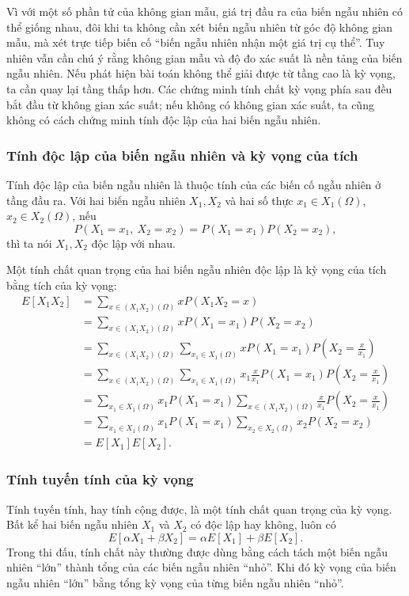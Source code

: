 \documentclass[11pt]{article}
\begin{document}
Vì với một số phần tử của không gian mẫu, giá trị đầu ra của biến ngẫu nhiên
có thể giống nhau, đôi khi ta không cần xét biến ngẫu nhiên từ góc độ không
gian mẫu, mà xét trực tiếp biến cố ``biến ngẫu nhiên nhận một giá trị cụ
thể''. Tuy nhiên vẫn cần chú ý rằng không gian mẫu và độ đo xác suất là nền
tảng của biến ngẫu nhiên. Nếu phát hiện bài toán không thể giải được từ tầng
cao là kỳ vọng, ta cần quay lại tầng thấp hơn. Các chứng minh tính chất kỳ
vọng phía sau đều bắt đầu từ không gian xác suất; nếu không có không gian xác
suất, ta cũng không có cách chứng minh tính độc lập của hai biến ngẫu nhiên.

\subsubsection{Tính độc lập của biến ngẫu nhiên và kỳ vọng của tích}

Tính độc lập của biến ngẫu nhiên là thuộc tính của các biến cố ngẫu nhiên ở
tầng đầu ra. Với hai biến ngẫu nhiên \(X_1,X_2\) và hai số thực
\(x_1\in X_1(\Omega)\), \(x_2\in X_2(\Omega)\), nếu
\[
  P(X_1=x_1,\ X_2=x_2)=P(X_1=x_1)P(X_2=x_2),
\]
thì ta nói \(X_1,X_2\) độc lập với nhau.

Một tính chất quan trọng của hai biến ngẫu nhiên độc lập là kỳ vọng của tích
bằng tích của kỳ vọng:
\[
\begin{aligned}
E[X_1X_2]
  &= \sum_{x\in (X_1X_2)(\Omega)} xP(X_1X_2=x)\\
  &= \sum_{x\in (X_1X_2)(\Omega)}
     xP(X_1=x_1)P(X_2=x_2)\\
  &= \sum_{x\in (X_1X_2)(\Omega)}
     \sum_{x_1\in X_1(\Omega)}
     xP(X_1=x_1)P\left(X_2=\frac{x}{x_1}\right)\\
  &= \sum_{x\in (X_1X_2)(\Omega)}
     \sum_{x_1\in X_1(\Omega)}
     x_1\frac{x}{x_1}P(X_1=x_1)P\left(X_2=\frac{x}{x_1}\right)\\
  &= \sum_{x_1\in X_1(\Omega)} x_1P(X_1=x_1)
     \sum_{x\in (X_1X_2)(\Omega)}
     \frac{x}{x_1}P\left(X_2=\frac{x}{x_1}\right)\\
  &= \sum_{x_1\in X_1(\Omega)} x_1P(X_1=x_1)
     \sum_{x_2\in X_2(\Omega)} x_2P(X_2=x_2)\\
  &= E[X_1]E[X_2].
\end{aligned}
\]

\subsubsection{Tính tuyến tính của kỳ vọng}

Tính tuyến tính, hay tính cộng được, là một tính chất quan trọng của kỳ vọng.
Bất kể hai biến ngẫu nhiên \(X_1\) và \(X_2\) có độc lập hay không, luôn có
\[
  E[\alpha X_1+\beta X_2]=\alpha E[X_1]+\beta E[X_2].
\]
Trong thi đấu, tính chất này thường được dùng bằng cách tách một biến ngẫu
nhiên ``lớn'' thành tổng của các biến ngẫu nhiên ``nhỏ''. Khi đó kỳ vọng của
biến ngẫu nhiên ``lớn'' bằng tổng kỳ vọng của từng biến ngẫu nhiên ``nhỏ''.
\end{document}
